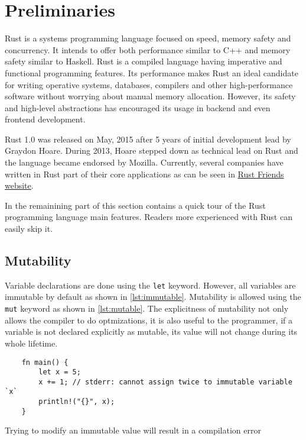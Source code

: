 \chapter{Preliminaries}
\label{chapter:preliminaries}

Rust is a systems programming language focused on speed, memory safety and concurrency. It intends to offer both performance similar to C++ and memory safety similar to Haskell. Rust is a compiled language having imperative and functional programming features. Its performance makes Rust an ideal candidate for writing operative systems, databases, compilers and other high-performance software without worrying about manual memory allocation. However, its safety and high-level abstractions has encouraged its usage in backend and even frontend development. 

Rust 1.0 was released on May, 2015 after 5 years of initial development lead by Graydon Hoare. During 2013, Hoare stepped down as technical lead on Rust and the language became endorsed by Mozilla. Currently, several companies have written in Rust part of their core applications as can be seen in \href{https://www.rust-lang.org/en-US/friends.html}{Rust Friends website}.

In the remainining part of this section contains a quick tour of the Rust programming language main features. Readers more experienced with Rust can easily skip it.

\section{Mutability}
Variable declarations are done using the \texttt{let} keyword. However, all variables are immutable by default as shown in \ref{lst:immutable}. Mutability is allowed using the \texttt{mut} keyword as shown in \ref{lst:mutable}. The explicitness of mutability not only allows the compiler to do optmizations, it is also useful to the programmer, if a variable is not declared explicitly as mutable, its value will not change during its whole lifetime.

\begin{listing}
	\begin{verbatim}
    fn main() {
        let x = 5;
        x += 1; // stderr: cannot assign twice to immutable variable `x`
        println!("{}", x);
    }
	\end{verbatim}
  \caption{Trying to modify an immutable value will result in a compilation error}
  \label{lst:immutable}
\end{listing}

